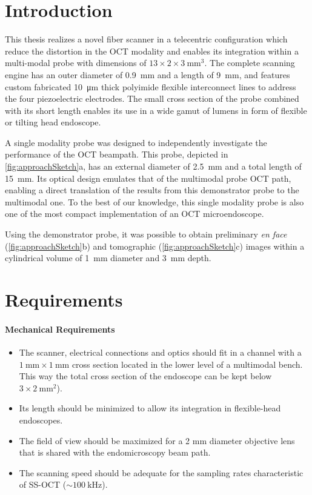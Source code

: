 \documentclass[10pt]{iopart}
\begin{document}
\section{Introduction}
This thesis realizes a novel fiber scanner in a telecentric configuration which reduce the distortion in the OCT modality and enables its integration within a multi-modal probe with dimensions of $13 \times 2 \times \SI{3}{\milli\meter^3}$. The complete scanning engine has an outer diameter of \SI{0.9}{\milli\meter} and a length of \SI{9}{\milli\meter}, and features custom fabricated \SI{10}{\micro\meter} thick polyimide flexible interconnect lines to address the four piezoelectric electrodes. The small cross section of the probe combined with its short length enables its use in a wide gamut of lumens in form of flexible or tilting head endoscope.

A single modality probe was designed to independently investigate the performance of the OCT beampath. This probe, depicted in \ref{fig:approachSketch}a, has an external diameter of \SI{2.5}{\milli\meter} and a total length of \SI{15}{\milli\meter}. Its optical design emulates that of the multimodal probe OCT path, enabling a direct translation of the results from this demonstrator probe to the multimodal one. To the best of our knowledge, this single modality probe is also one of the most compact implementation of an OCT microendoscope.

Using the demonstrator probe, it was possible to obtain preliminary \textit{en face} (\ref{fig:approachSketch}b) and tomographic (\ref{fig:approachSketch}c) images within a cylindrical volume of \SI{1}{\milli\meter} diameter and \SI{3}{\milli\meter} depth.

\section{Requirements}
\paragraph{Mechanical Requirements} 
\begin{itemize}

\item The scanner, electrical connections and optics should fit in a channel with a $\SI{1}{\milli\meter} \times \SI{1}{\milli\meter}$ cross section located in the lower level of a multimodal bench. This way the total cross section of the endoscope can be kept below $3 \times \SI{2}{\milli\meter^2}$). 
\item Its length should be minimized to allow its integration in flexible-head endoscopes.
\item The field of view should be maximized for a 2 mm diameter objective lens that is shared with the endomicroscopy beam path.
\item The scanning speed should be adequate for the sampling rates characteristic of SS-OCT ($\sim \SI{100}{\kilo\hertz} $).
\end{itemize}
\end{document}
